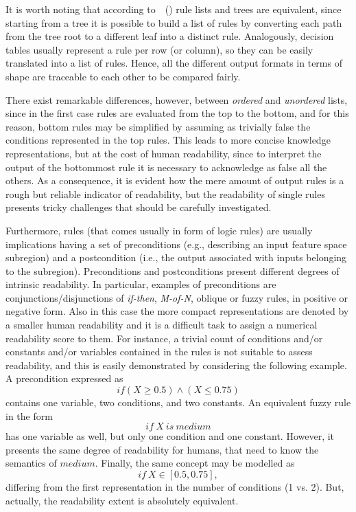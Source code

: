 \documentclass{article}
\begin{document}
It is worth noting that according to~\citeauthor{sabbatini2022-metrics}~(\citeyear{sabbatini2022-metrics}) rule lists and trees are equivalent, since starting from a tree it is possible to build a list of rules by converting each path from the tree root to a different leaf into a distinct rule.
%
Analogously, decision tables usually represent a rule per row (or column), so they can be easily translated into a list of rules. 
%
Hence, all the different output formats in terms of shape are traceable to each other to be compared fairly.

There exist remarkable differences, however, between \emph{ordered} and \emph{unordered} lists, since in the first case rules are evaluated from the top to the bottom, and for this reason, bottom rules may be simplified by assuming as trivially false the conditions represented in the top rules.
%
This leads to more concise knowledge representations, but at the cost of human readability, since to interpret the output of the bottommost rule it is necessary to acknowledge as false all the others.
%
As a consequence, it is evident how the mere amount of output rules is a rough but reliable indicator of readability, but the readability of single rules presents tricky challenges that should be carefully investigated.

Furthermore, rules (that comes usually in form of logic rules) are usually implications having a set of preconditions (e.g., describing an input feature space subregion) and a postcondition (i.e., the output associated with inputs belonging to the subregion).
%
Preconditions and postconditions present different degrees of intrinsic readability.
%
In particular, examples of preconditions are {con\-junc\-tions}/disjunctions of \emph{if-then}, \emph{M-of-N}, oblique or fuzzy rules, in positive or negative form.
%
Also in this case the more compact representations are denoted by a smaller human readability and it is a difficult task to assign a numerical readability score to them.
%
For instance, a trivial count of conditions and/or constants and/or variables contained in the rules is not suitable to assess readability, and this is easily demonstrated by considering the following example.
%
A precondition expressed as
%
\begin{equation*}
	if (X \geq 0.5) \wedge (X \leq 0.75)
\end{equation*}
%
contains one variable, two conditions, and two constants.
%
An equivalent fuzzy rule in the form 
%
\begin{equation*}
	if~X~is~medium
\end{equation*}
%
has one variable as well, but only one condition and one constant.
%
However, it presents the same degree of readability for humans, that need to know the semantics of $medium$.
%
Finally, the same concept may be modelled as 
%
\begin{equation*}
	if~X \in [0.5, 0.75],
\end{equation*}
%
differing from the first representation in the number of conditions (1 vs. 2).
%
But, actually, the readability extent is absolutely equivalent.
\end{document}
